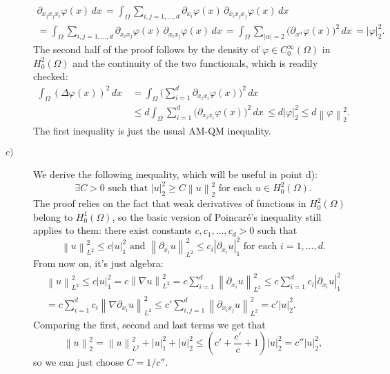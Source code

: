 \documentclass[a4paper]{article}
\newcommand{\abs}[1]{\left\lvert#1\right\rvert}
\newcommand{\dx}{\, dx \,}
\newcommand{\norm}[1]{\left\lVert#1\right\rVert}
\newcommand{\normltwo}[1]{\left\lVert#1\right\rVert_{L^2}}
\newcommand{\seminorm}[1]{\left\lvert#1\right\rvert}
\begin{document}
\begin{description}
\begin{gather*}
	                                   \partial_{x_j x_j x_i} \varphi(x) \dx
	= \int_\Omega \sum_{i,j=1,\dots,d} \partial_{x_i} \varphi(x) \,
	                                   \partial_{x_i x_j x_j} \varphi(x) \dx \\
	= \int_\Omega \sum_{i,j=1,\dots,d} \partial_{x_i x_j} \varphi(x) \,
	                                   \partial_{x_i x_j} \varphi(x) \dx
	= \int_\Omega \sum_{\abs{\alpha}=2} \big( \partial_{x^\alpha} \varphi(x) \big)^2 \dx
	= \seminorm{\varphi}_2^2.
	\end{gather*}
	The second half of the proof follows by the density of
	$\varphi \in C_0^\infty(\Omega)$ in $H_0^2(\Omega)$ and the continuity
	of the two functionals, which is readily checked:
	\begin{align*}
	\int_\Omega (\Delta\varphi(x))^2 \dx
&	= \int_\Omega \big( \sum_{i=1}^d \partial_{x_i x_i} \varphi(x) \big)^2 \dx \\
&	\leq d \int_\Omega \sum_{i=1}^d \big( \partial_{x_i x_i} \varphi(x) \big)^2 \dx
	\leq d \seminorm{\varphi}_2^2
	\leq d \norm{\varphi}_2^2.
	\end{align*}
	The first inequality is just the usual AM-QM inequality.
\item[$c)$] We derive the following inequality, which will be useful in point d):
	\[
	\exists C > 0 \text{ such that }
	\seminorm{u}_2^2 \geq C \norm{u}_2^2 \text{ for each } u \in H_0^2(\Omega).
	\]
	The proof relies on the fact that weak derivatives of functions in $H_0^2(\Omega)$
	belong to $H_0^1(\Omega)$, so the basic version of Poincaré's inequality
	still applies to them: there exist constants $c,c_1,\dots,c_d > 0$ such that
	\[
	\normltwo{u}^2 \leq c \seminorm{u}_1^2 \text{ and }
	\normltwo{\partial_{x_i} u}^2 \leq c_i \seminorm{\partial_{x_i} u}_1^2
	\text{ for each } i = 1,\dots,d.
	\]
	From now on, it's just algebra:
	\begin{gather*}
	\normltwo{u}^2
	\leq c \seminorm{u}_1^2
	= c \normltwo{\nabla u}^2
	= c \sum_{i=1}^d \normltwo{\partial_{x_i} u}^2
	\leq c \sum_{i=1}^d c_i \seminorm{\partial_{x_i} u}_1^2 \\
	= c \sum_{i=1}^d c_i \normltwo{\nabla \partial_{x_i} u}^2
	\leq c' \sum_{i,j=1}^d \normltwo{\partial_{x_i x_j} u}^2
	= c' \seminorm{u}_2^2.
	\end{gather*}
	Comparing the first, second and last terms we get that
	\[
	\norm{u}_2^2
	= \normltwo{u}^2 + \seminorm{u}_1^2 + \seminorm{u}_2^2
	\leq \left( c' + \frac{c'}{c} + 1 \right) \seminorm{u}_2^2
	= c'' \seminorm{u}_2^2,
	\]
	so we can just choose $C = 1/c''$.

\end{description}
\end{document}
